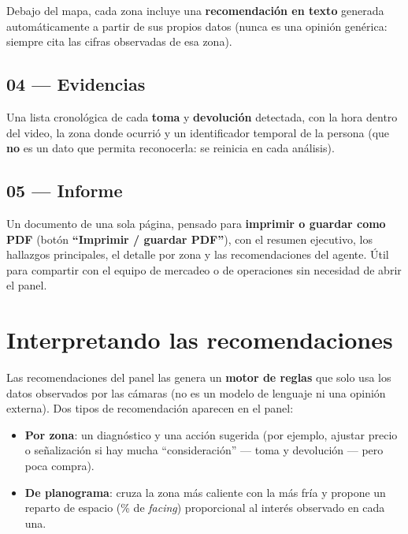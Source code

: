 \documentclass[11pt,a4paper]{report}
\begin{document}
Debajo del mapa, cada zona incluye una \textbf{recomendación en texto} generada automáticamente
a partir de sus propios datos (nunca es una opinión genérica: siempre cita las cifras observadas
de esa zona).

\section{04 --- Evidencias}

Una lista cronológica de cada \textbf{toma} y \textbf{devolución} detectada, con la hora dentro
del video, la zona donde ocurrió y un identificador temporal de la persona (que \textbf{no} es un
dato que permita reconocerla: se reinicia en cada análisis).

\section{05 --- Informe}

Un documento de una sola página, pensado para \textbf{imprimir o guardar como PDF}
(botón \textbf{``Imprimir / guardar PDF''}), con el resumen ejecutivo, los hallazgos principales,
el detalle por zona y las recomendaciones del agente. Útil para compartir con el equipo de
mercadeo o de operaciones sin necesidad de abrir el panel.

\chapter{Interpretando las recomendaciones}

Las recomendaciones del panel las genera un \textbf{motor de reglas} que solo usa los datos
observados por las cámaras (no es un modelo de lenguaje ni una opinión externa). Dos tipos de
recomendación aparecen en el panel:

\begin{itemize}
  \item \textbf{Por zona}: un diagnóstico y una acción sugerida (por ejemplo, ajustar precio o
    señalización si hay mucha ``consideración'' --- toma y devolución --- pero poca compra).
  \item \textbf{De planograma}: cruza la zona más caliente con la más fría y propone un reparto
    de espacio (\% de \textit{facing}) proporcional al interés observado en cada una.
\end{itemize}
\end{document}
